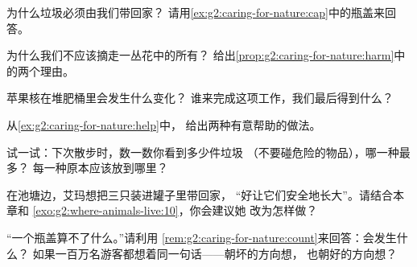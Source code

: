 \begin{exercise}[$\star$]\label{exo:g2:caring-for-nature:4}
为什么垃圾必须由我们带回家？
请用\cref{ex:g2:caring-for-nature:cap}中的瓶盖来回答。
\end{exercise}

\begin{exercise}[$\star$]\label{exo:g2:caring-for-nature:5}
为什么我们不应该摘走一丛花中的所有？
给出\cref{prop:g2:caring-for-nature:harm}中的两个理由。
\end{exercise}

\begin{exercise}[$\star$]\label{exo:g2:caring-for-nature:6}
苹果核在堆肥桶里会发生什么变化？
谁来完成这项工作，我们最后得到什么？
\end{exercise}

\begin{exercise}[$\star$]\label{exo:g2:caring-for-nature:7}
从\cref{ex:g2:caring-for-nature:help}中，
给出两种有意帮助的做法。
\end{exercise}

\begin{exercise}[$\star$]\label{exo:g2:caring-for-nature:8}
试一试：下次散步时，数一数你看到多少件垃圾
（不要碰危险的物品），哪一种最多？
每一种原本应该放到哪里？
\end{exercise}

\begin{exercise}[$\star\star$]\label{exo:g2:caring-for-nature:9}
在池塘边，艾玛想把三只装进罐子里带回家，
“好让它们安全地长大”。请结合本章和
\cref{exo:g2:where-animals-live:10}，你会建议她
改为怎样做？
\end{exercise}

\begin{exercise}[$\star\star$]\label{exo:g2:caring-for-nature:10}
“一个瓶盖算不了什么。”请利用
\cref{rem:g2:caring-for-nature:count}来回答：会发生什么？
如果一百万名游客都想着同一句话——朝坏的方向想，
也朝好的方向想？
\end{exercise}
